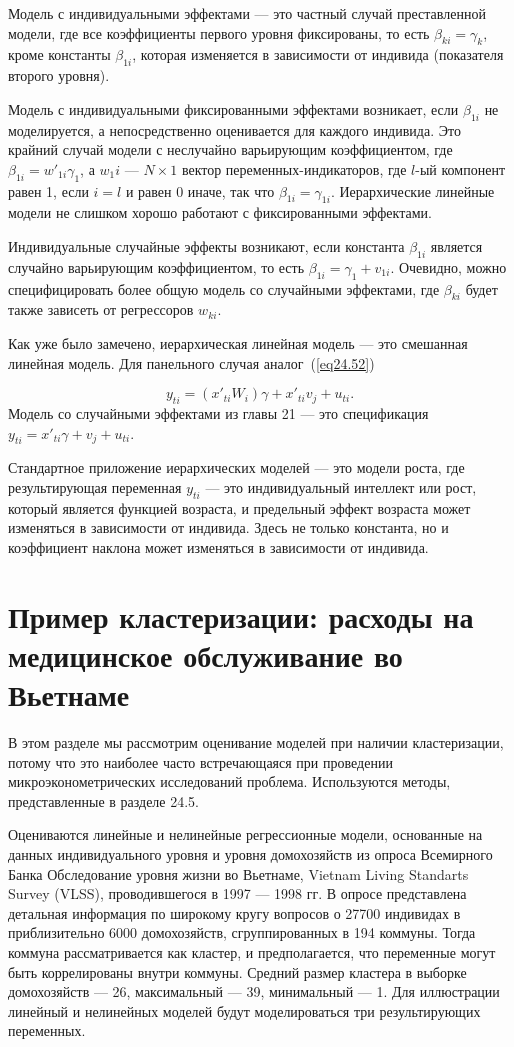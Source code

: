 Модель с индивидуальными эффектами --- это частный случай преставленной модели, где все коэффициенты первого уровня фиксированы, то есть $\beta_{ki} = \gamma_k$, кроме константы $\beta_{1i}$, которая изменяется в зависимости от индивида (показателя второго уровня). 

Модель с индивидуальными фиксированными эффектами возникает, если $\beta_{1i}$ не моделируется, а непосредственно оценивается для каждого индивида. Это крайний случай модели с неслучайно варьирующим коэффициентом, где $\beta_{1i} = w'_{1i} \gamma_1$, а $w_1i$ --- $N \times 1$ вектор переменных-индикаторов, где $l$-ый компонент равен 1, если $i=l$ и равен 0 иначе, так что $\beta_{1i} = \gamma_{1i}$. Иерархические линейные модели не слишком хорошо работают с фиксированными эффектами. 

Индивидуальные случайные эффекты возникают, если константа $\beta_{1i}$ является случайно варьирующим коэффициентом, то есть $\beta_{1i} = \gamma_1 + v_{1i}$. Очевидно, можно специфицировать более общую модель со случайными эффектами, где $\beta_{ki}$ будет также зависеть от регрессоров $w_{ki}$. 

Как уже было замечено, иерархическая линейная модель --- это смешанная линейная модель. Для панельного случая аналог~(\ref{eq24.52})

$$
y_{ti} = (x'_{ti} W_i) \gamma + x'_{ti} v_j + u_{ti}. 
$$
Модель со случайными эффектами из главы 21 --- это спецификация $y_{ti} = x'_{ti} \gamma + v_j + u_{ti}$.

Стандартное приложение иерархических моделей --- это модели роста, где результирующая переменная $y_{ti}$ --- это индивидуальный интеллект или рост, который является функцией возраста, и предельный эффект возраста может изменяться в зависимости от индивида. Здесь не только константа, но и коэффициент наклона может изменяться в зависимости от индивида. 

\section{Пример кластеризации: расходы на медицинское обслуживание во Вьетнаме}

В этом разделе мы рассмотрим оценивание моделей при наличии кластеризации, потому что это наиболее часто встречающаяся при проведении микроэконометрических исследований проблема. Используются методы, представленные в разделе 24.5. 

Оцениваются линейные и нелинейные регрессионные модели, основанные на данных индивидуального уровня и уровня домохозяйств из опроса Всемирного Банка Обследование уровня жизни во Вьетнаме, Vietnam Living Standarts Survey (VLSS), проводившегося в 1997 --- 1998 гг. В опросе представлена детальная информация по широкому кругу вопросов о 27700 индивидах в приблизительно 6000 домохозяйств, сгруппированных в 194 коммуны. Тогда коммуна рассматривается как кластер, и предполагается, что переменные могут быть коррелированы внутри коммуны. Средний размер кластера в выборке домохозяйств --- 26, максимальный --- 39, минимальный --- 1. Для иллюстрации линейный и нелинейных моделей будут моделироваться три результирующих переменных. 

